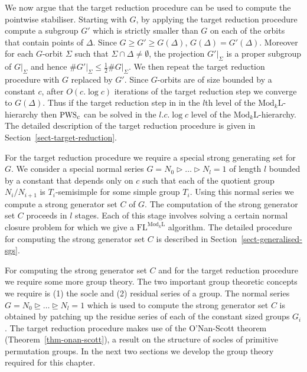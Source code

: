 \documentclass[11pt]{madras}%
\theoremstyle{remark}
\newcommand{\ModkL}[1]{{\ensuremath{\mathrm{Mod}_{#1}\mathrm{L}}}}
\newcommand{\ProblemFont}[1]{{\ensuremath{\textrm{\small #1}}}}
\newcommand{\pr}[2]{{\ensuremath{\left.{#1}\right\vert_{#2}}}}
\newcommand{\pointwise}[2]{{\ensuremath{#1\left(#2\right)}}}
\begin{document}
We now argue that the target reduction procedure can be used to
compute the pointwise stabiliser. Starting with $G$, by applying the
target reduction procedure compute a subgroup $G'$ which is strictly
smaller than $G$ on each of the orbits that contain points of
$\Delta$.  Since $G \geq G' \geq \pointwise{G}{\Delta}$,
$\pointwise{G}{\Delta} = \pointwise{G'}{\Delta}$. Moreover for each
$G$-orbit $\Sigma$ such that $\Sigma \cap \Delta \neq \emptyset$, the
projection $\pr{G'}{\Sigma}$ is a proper subgroup of $\pr{G}{\Sigma}$
and hence $\# \pr{G'}{\Sigma} \leq \frac{1}{2} \# \pr{G}{\Sigma}$.  We
then repeat the target reduction procedure with $G$ replaced by $G'$.
Since $G$-orbits are of size bounded by a constant $c$, after
$O(c.\log{c})$ iterations of the target reduction step we converge to
$\pointwise{G}{\Delta}$. Thus if the target reduction step in in the
$l$th level of the $\ModkL{k}$-hierarchy then $\ProblemFont{PWS}_c$
can be solved in the $l.c.\log{c}$ level of the $\ModkL{k}$-hierarchy.
The detailed description of the target reduction procedure is given in
Section~\ref{sect-target-reduction}.

For the target reduction procedure we require a special strong
generating set for $G$. We consider a special normal series $G = N_0
\rhd \ldots \rhd N_l = 1$ of length $l$ bounded by a constant that
depends only on $c$ such that each of the quotient group $N_i/N_{i+1}$
is $T_i$-semisimple for some simple group $T_i$. Using this normal
series we compute a strong generator set $C$ of $G$. The computation
of the strong generator set $C$ proceeds in $l$ stages. Each of this
stage involves solving a certain normal closure problem for which we
give a $\mathrm{FL}^{\ModkL{k}}$ algorithm. The detailed procedure for
computing the strong generator set $C$ is described in
Section~\ref{sect-generalised-sgs}.

For computing the strong generator set $C$ and for the target
reduction procedure we require some more group theory. The two
important group theoretic concepts we require is (1) the socle and (2)
residual series of a group.  The normal series $G = N_0 \unrhd \ldots
\unrhd N_l = 1$ which is used to compute the strong generator set $C$
is obtained by patching up the residue series of each of the constant
sized groups $G_i$. The target reduction procedure makes use of the
O'Nan-Scott theorem (Theorem~\ref{thm-onan-scott}), a result on the
structure of socles of primitive permutation groups.  In the next two
sections we develop the group theory required for this chapter.
\end{document}
